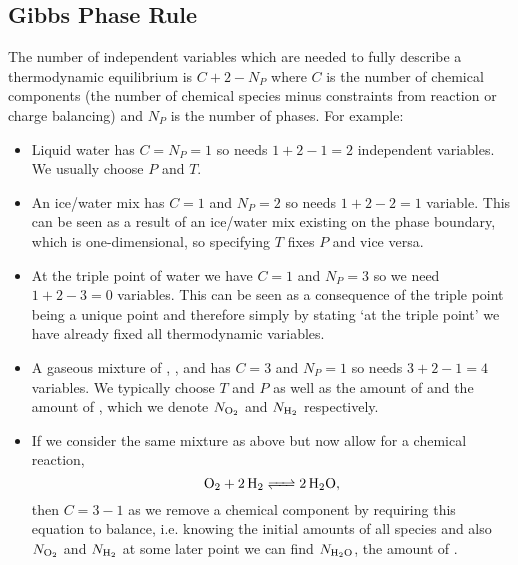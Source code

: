     \subsection{Gibbs Phase Rule}
    The number of independent variables which are needed to fully describe a thermodynamic equilibrium is \(C + 2 - N_P\) where \(C\) is the number of chemical components (the number of chemical species minus constraints from reaction or charge balancing) and \(N_P\) is the number of phases.
    For example:
    \begin{itemize}
        \item Liquid water has \(C = N_P = 1\) so needs \(1 + 2 - 1 = 2\) independent variables.
        We usually choose \(P\) and \(T\).
        \item An ice/water mix has \(C = 1\) and \(N_P = 2\) so needs \(1 + 2 - 2 = 1\) variable.
        This can be seen as a result of an ice/water mix existing on the phase boundary, which is one-dimensional, so specifying \(T\) fixes \(P\) and vice versa.
        \item At the triple point of water we have \(C = 1\) and \(N_P = 3\) so we need \(1 + 2 - 3 = 0\) variables.
        This can be seen as a consequence of the triple point being a unique point and therefore simply by stating `at the triple point' we have already fixed all thermodynamic variables.
        \item A gaseous mixture of , , and  has \(C = 3\) and \(N_P = 1\) so needs \(3 + 2 - 1 = 4\) variables.
        We typically choose \(T\) and \(P\) as well as the amount of  and the amount of , which we denote \(N_{\ce{O2}}\) and \(N_{\ce{H2}}\) respectively.
        \item If we consider the same mixture as above but now allow for a chemical reaction,
        \[\ce{O2 + 2H2 <=> 2H2O},\]
        then \(C = 3 - 1\) as we remove a chemical component by requiring this equation to balance, i.e. knowing the initial amounts of all species and also \(N_{\ce{O2}}\) and \(N_{\ce{H2}}\) at some later point we can find \(N_{\ce{H2O}}\), the amount of .
    \end{itemize}
